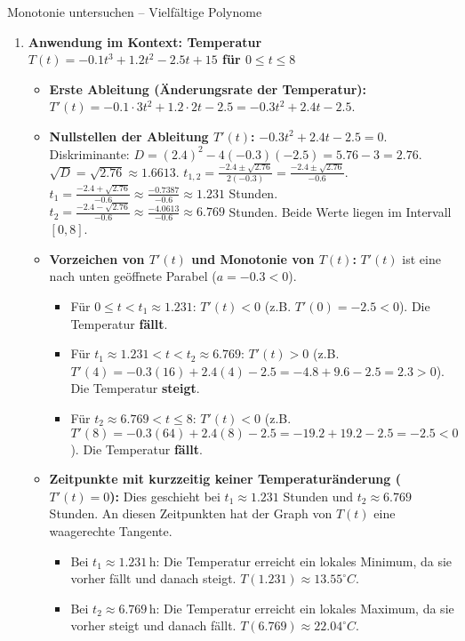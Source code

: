 \begin{loesungsumgebung}{Monotonie untersuchen – Vielfältige Polynome}
\begin{enumerate}[label=(\alph*)]
    \item \textbf{Anwendung im Kontext: Temperatur $T(t) = -0.1t^3 + 1.2t^2 - 2.5t + 15$ für $0 \le t \le 8$}
    \begin{itemize}
        \item \textbf{Erste Ableitung (Änderungsrate der Temperatur):}
        $T'(t) = -0.1 \cdot 3t^2 + 1.2 \cdot 2t - 2.5 = -0.3t^2 + 2.4t - 2.5$.
        \item \textbf{Nullstellen der Ableitung $T'(t)$:}
        $-0.3t^2 + 2.4t - 2.5 = 0$.
        Diskriminante: $D = (2.4)^2 - 4(-0.3)(-2.5) = 5.76 - 3 = 2.76$.
        $\sqrt{D} = \sqrt{2.76} \approx 1.6613$.
        $t_{1,2} = \frac{-2.4 \pm \sqrt{2.76}}{2(-0.3)} = \frac{-2.4 \pm \sqrt{2.76}}{-0.6}$.
        $t_1 = \frac{-2.4 + \sqrt{2.76}}{-0.6} \approx \frac{-0.7387}{-0.6} \approx 1.231$ Stunden.
        $t_2 = \frac{-2.4 - \sqrt{2.76}}{-0.6} \approx \frac{-4.0613}{-0.6} \approx 6.769$ Stunden.
        Beide Werte liegen im Intervall $[0, 8]$.
        \item \textbf{Vorzeichen von $T'(t)$ und Monotonie von $T(t)$:}
        $T'(t)$ ist eine nach unten geöffnete Parabel ($a=-0.3<0$).
        \begin{itemize}
            \item Für $0 \le t < t_1 \approx 1.231$: $T'(t) < 0$ (z.B. $T'(0) = -2.5 < 0$). Die Temperatur \textbf{fällt}.
            \item Für $t_1 \approx 1.231 < t < t_2 \approx 6.769$: $T'(t) > 0$ (z.B. $T'(4) = -0.3(16) + 2.4(4) - 2.5 = -4.8 + 9.6 - 2.5 = 2.3 > 0$). Die Temperatur \textbf{steigt}.
            \item Für $t_2 \approx 6.769 < t \le 8$: $T'(t) < 0$ (z.B. $T'(8) = -0.3(64) + 2.4(8) - 2.5 = -19.2 + 19.2 - 2.5 = -2.5 < 0$). Die Temperatur \textbf{fällt}.
        \end{itemize}
        \item \textbf{Zeitpunkte mit kurzzeitig keiner Temperaturänderung ($T'(t)=0$):}
        Dies geschieht bei $t_1 \approx 1.231$ Stunden und $t_2 \approx 6.769$ Stunden. An diesen Zeitpunkten hat der Graph von $T(t)$ eine waagerechte Tangente.
        \begin{itemize}
            \item Bei $t_1 \approx 1.231\,$h: Die Temperatur erreicht ein lokales Minimum, da sie vorher fällt und danach steigt. $T(1.231) \approx 13.55^\circ C$.
            \item Bei $t_2 \approx 6.769\,$h: Die Temperatur erreicht ein lokales Maximum, da sie vorher steigt und danach fällt. $T(6.769) \approx 22.04^\circ C$.

\end{itemize}
\end{itemize}
\end{enumerate}
\end{loesungsumgebung}
